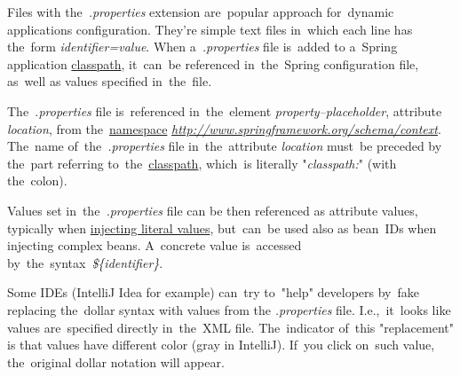 Files with the~\textit{.properties} extension are~popular approach for~dynamic applications configuration. They're simple text files in~which each line has the~form \textit{identifier=value}. When a~\textit{.properties} file is~added to a~Spring application \hyperref[classpath]{classpath}, it~can~be referenced in~the~Spring configuration file, as~well as values specified in~the~file.

The~\textit{.properties} file is~referenced in~the~element \textit{property--placeholder}, attribute \textit{location}, from the~\hyperref[namespaces]{namespace} \textit{\href{http://www.springframework.org/schema/context}{http://www.springframework.org/schema/context}}. The~name of~the~\textit{.properties} file in~the~attribute \textit{location} must~be preceded by the~part referring to~the~\hyperref[classpath]{classpath}, which~is literally "\textit{classpath:}" (with the~colon).

Values set in~the~\textit{.properties} file can be then referenced as attribute values, typically when \hyperref[injectingliteralvalues]{injecting literal values}, but~can~be used also as bean~IDs when injecting complex beans. A~concrete value is~accessed by~the~syntax~\textit{\$\{identifier\}}.

\warning Some IDEs (IntelliJ Idea for example) can~try to~"help" developers by~fake replacing the~dollar syntax with values from the \textit{.properties} file. I.e.,~it~looks like values are~specified directly in~the~XML file. The~indicator of~this "replacement" is that values have different color (gray in IntelliJ). If~you click on~such value, the~original dollar notation will appear.\\

